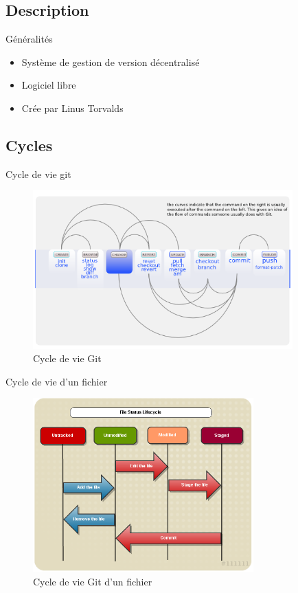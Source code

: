 \begin{frame}
	\sectionpage
\end{frame}

\subsection{Description}
	\begin{frame}{Généralités}
		\begin{itemize}[<+->]
			\item Système de gestion de version décentralisé
			\item Logiciel libre
			\item Crée par Linus Torvalds
		\end{itemize}

	\end{frame}

\subsection{Cycles}
	
	\begin{frame}{Cycle de vie git}
		\begin{figure}
			\centering
			\includegraphics[width=100mm]{./Img/GitCycle.png}
			\caption{Cycle de vie Git}
		\end{figure}

		
	\end{frame}
	
	\begin{frame}{Cycle de vie d'un fichier}
		\begin{figure}
			\centering
			\includegraphics[width=85mm]{./Img/GitLife.png}
			\caption{Cycle de vie Git d'un fichier}
		\end{figure}

	 
	\end{frame}


